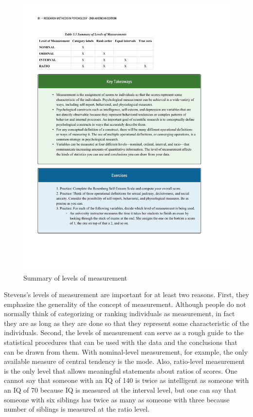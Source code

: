 \begin{figure}

      \includegraphics[width=\linewidth]{figures/C5Mscales.pdf}
      \caption{Summary of levels of measurement}
      \label{fig:scales}
\end{figure}

Stevens's levels of measurement are important for at least two reasons. First, they emphasize the generality of the concept of measurement. Although people do not normally think of categorizing or ranking individuals as measurement, in fact they are as long as they are done so that they represent some characteristic of the individuals. Second, the levels of measurement can serve as a rough guide to the statistical procedures that can be used with the data and the conclusions that can be drawn from them. With nominal-level measurement, for example, the only available measure of central tendency is the mode. Also, ratio-level measurement is the only level that allows meaningful statements about ratios of scores. One cannot say that someone with an IQ of 140 is twice as intelligent as someone with an IQ of 70 because IQ is measured at the interval level, but one can say that someone with six siblings has twice as many as someone with three because number of siblings is measured at the ratio level.
        

